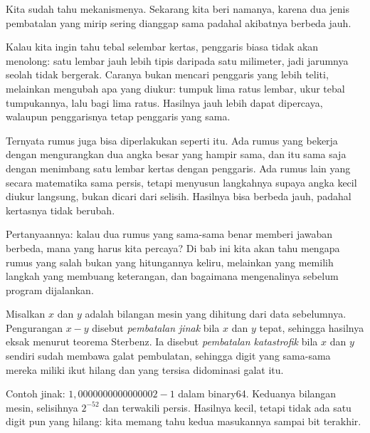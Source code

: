 Kita sudah tahu mekanismenya. Sekarang kita beri namanya, karena dua jenis pembatalan
yang mirip sering dianggap sama padahal akibatnya berbeda jauh.

\begin{untukanak}
Kalau kita ingin tahu tebal selembar kertas, penggaris biasa tidak akan menolong: satu
lembar jauh lebih tipis daripada satu milimeter, jadi jarumnya seolah tidak bergerak.
Caranya bukan mencari penggaris yang lebih teliti, melainkan mengubah apa yang diukur:
tumpuk lima ratus lembar, ukur tebal tumpukannya, lalu bagi lima ratus. Hasilnya jauh
lebih dapat dipercaya, walaupun penggarisnya tetap penggaris yang sama.

Ternyata rumus juga bisa diperlakukan seperti itu. Ada rumus yang bekerja dengan
mengurangkan dua angka besar yang hampir sama, dan itu sama saja dengan menimbang
satu lembar kertas dengan penggaris. Ada rumus lain yang secara matematika sama
persis, tetapi menyusun langkahnya supaya angka kecil diukur langsung, bukan dicari
dari selisih. Hasilnya bisa berbeda jauh, padahal kertasnya tidak berubah.

Pertanyaannya: kalau dua rumus yang sama-sama benar memberi jawaban berbeda, mana yang
harus kita percaya? Di bab ini kita akan tahu mengapa rumus yang salah bukan yang
hitungannya keliru, melainkan yang memilih langkah yang membuang keterangan, dan
bagaimana mengenalinya sebelum program dijalankan.
\end{untukanak}


\begin{definisi}
Misalkan $x$ dan $y$ adalah bilangan mesin yang dihitung dari data sebelumnya.
Pengurangan $x-y$ disebut \emph{pembatalan jinak} bila $x$ dan $y$ tepat, sehingga
hasilnya eksak menurut teorema Sterbenz. Ia disebut \emph{pembatalan katastrofik} bila
$x$ dan $y$ sendiri sudah membawa galat pembulatan, sehingga digit yang sama-sama
mereka miliki ikut hilang dan yang tersisa didominasi galat itu.
\end{definisi}

Contoh jinak: $1{,}0000000000000002-1$ dalam binary64. Keduanya bilangan mesin,
selisihnya $2^{-52}$ dan terwakili persis. Hasilnya kecil, tetapi tidak ada satu digit
pun yang hilang: kita memang tahu kedua masukannya sampai bit terakhir.

